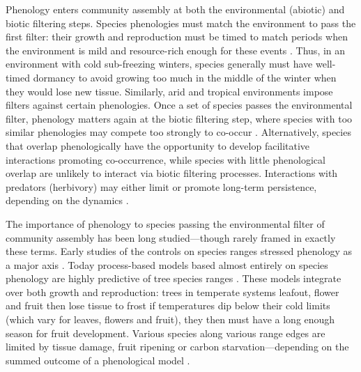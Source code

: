 \documentclass[11pt]{article}
\begin{document}
Phenology enters community assembly at both the environmental (abiotic) and biotic filtering steps. Species phenologies must match the environment to pass the first filter: their growth and reproduction must be timed to match periods when the environment is mild and resource-rich enough for these events \citep{rathcke1985phenological}. Thus, in an environment with cold sub-freezing winters, species generally must have well-timed dormancy to avoid growing too much in the middle of the winter when they would lose new tissue. Similarly, arid and tropical environments impose filters against certain phenologies. Once a set of species passes the environmental filter, phenology matters again at the biotic filtering step, where species with too similar phenologies may compete too strongly to co-occur \citep{gause1932experimental, abrams1983theory}.   Alternatively, species that overlap phenologically have the opportunity to develop facilitative interactions \citep{duchenne2021phenological} promoting co-occurrence, while species with little phenological overlap are unlikely to interact via biotic filtering processes. Interactions with predators (herbivory) may either limit or promote long-term persistence, depending on the dynamics \citep[such dynamics relate in part to a larger literature on trophic synchrony, for which we refer readers to a number of recent reviews, e.g.][]{kharouba2018global}.

The importance of phenology to species passing the environmental filter of community assembly has been long studied---though rarely framed in exactly these terms. Early studies of the controls on species ranges stressed phenology as a major axis \citep{salisbury1926geographical}. Today process-based models based almost entirely on species phenology are highly predictive of tree species ranges \citep[where they have been tested,][]{chuineJTB,Morin:2009gt,morin2007}. These models integrate over both growth and reproduction: trees in temperate systems leafout, flower and fruit then lose tissue to frost if temperatures dip below their cold limits (which vary for leaves, flowers and fruit), they then must have a long enough season for fruit development. Various species along various range edges are limited by tissue damage, fruit ripening or carbon starvation---depending on the summed outcome of a phenological model \citep{Chuine:2010gm}. 
\end{document}
